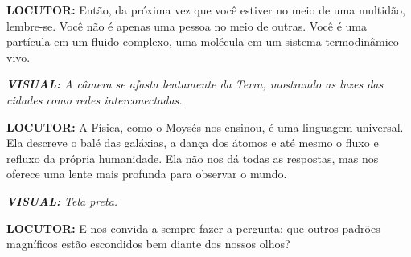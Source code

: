 \documentclass[a4paper, 10pt]{article}
\newcommand{\locutor}[1]{%
	\par\noindent\textcolor{locutorgray}{\textbf{LOCUTOR:} #1}%
}
\newcommand{\visual}[1]{%
	\par\noindent\textcolor{visualblue}{\textit{\textbf{VISUAL:} #1}}%
}
\begin{document}
	\locutor{Então, da próxima vez que você estiver no meio de uma multidão, lembre-se. Você não é apenas uma pessoa no meio de outras. Você é uma partícula em um fluido complexo, uma molécula em um sistema termodinâmico vivo.}
	
	\visual{A câmera se afasta lentamente da Terra, mostrando as luzes das cidades como redes interconectadas.}
	
	\locutor{A Física, como o Moysés nos ensinou, é uma linguagem universal. Ela descreve o balé das galáxias, a dança dos átomos e até mesmo o fluxo e refluxo da própria humanidade. Ela não nos dá todas as respostas, mas nos oferece uma lente mais profunda para observar o mundo.}
	
	\visual{Tela preta.}
	
	\locutor{E nos convida a sempre fazer a pergunta: que outros padrões magníficos estão escondidos bem diante dos nossos olhos?}
	
	
\end{document}
